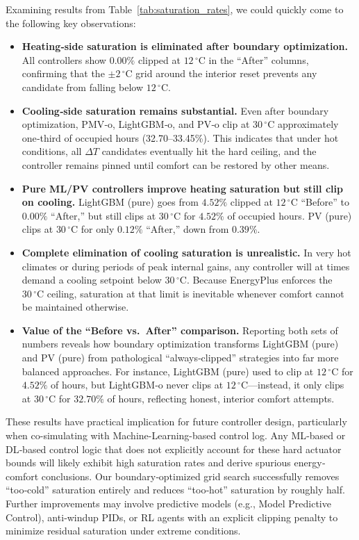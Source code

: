 Examining results from Table~\ref{tab:saturation_rates}, we could quickly come to the following key observations:
\begin{itemize}
  \item \textbf{Heating‐side saturation is eliminated after boundary optimization.} All controllers show $0.00\%$ clipped at $12\,^\circ\mathrm{C}$ in the ``After'' columns, confirming that the $\pm2\,^\circ\mathrm{C}$ grid around the interior reset prevents any candidate from falling below $12\,^\circ\mathrm{C}$.  
  \item \textbf{Cooling‐side saturation remains substantial.}  Even after boundary optimization, PMV‐o, LightGBM‐o, and PV‐o clip at $30\,^\circ\mathrm{C}$ approximately one‐third of occupied hours (32.70–33.45\%). This indicates that under hot conditions, all $\Delta T$ candidates eventually hit the hard ceiling, and the controller remains pinned until comfort can be restored by other means.  
  \item \textbf{Pure ML/PV controllers improve heating saturation but still clip on cooling.}  LightGBM (pure) goes from $4.52\%$ clipped at $12\,^\circ\mathrm{C}$ “Before” to $0.00\%$ “After,” but still clips at $30\,^\circ\mathrm{C}$ for $4.52\%$ of occupied hours. PV (pure) clips at $30\,^\circ\mathrm{C}$ for only $0.12\%$ “After,” down from $0.39\%$.  
  \item \textbf{Complete elimination of cooling saturation is unrealistic.}  In very hot climates or during periods of peak internal gains, any controller will at times demand a cooling setpoint below $30\,^\circ\mathrm{C}$. Because EnergyPlus enforces the $30\,^\circ\mathrm{C}$ ceiling, saturation at that limit is inevitable whenever comfort cannot be maintained otherwise.  
  \item \textbf{Value of the ``Before vs.\ After'' comparison.}  Reporting both sets of numbers reveals how boundary optimization transforms LightGBM (pure) and PV (pure) from pathological “always‐clipped” strategies into far more balanced approaches. For instance, LightGBM (pure) used to clip at $12\,^\circ\mathrm{C}$ for $4.52\%$ of hours, but LightGBM‐o never clips at $12\,^\circ\mathrm{C}$—instead, it only clips at $30\,^\circ\mathrm{C}$ for $32.70\%$ of hours, reflecting honest, interior comfort attempts.  
\end{itemize}
\noindent

These results have practical implication for future controller design, particularly when co-simulating with Machine-Learning-based control log. Any ML‐based or DL‐based control logic that does not explicitly account for these hard actuator bounds will likely exhibit high saturation rates and derive spurious energy‐comfort conclusions. Our boundary‐optimized grid search successfully removes “too‐cold” saturation entirely and reduces “too‐hot” saturation by roughly half. Further improvements may involve predictive models (e.g., Model Predictive Control), anti‐windup PIDs, or RL agents with an explicit clipping penalty to minimize residual saturation under extreme conditions.  

